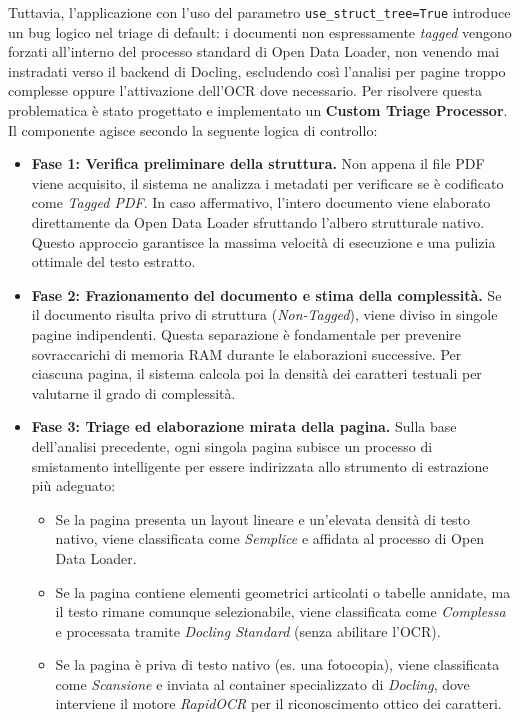 Tuttavia, l'applicazione con l'uso del parametro \texttt{use\_struct\_tree=True} introduce un bug logico nel triage di default: i documenti non espressamente \textit{tagged} vengono forzati all'interno del processo standard di Open Data Loader, non venendo mai instradati verso il backend di Docling, escludendo così l'analisi per pagine troppo complesse oppure l'attivazione dell'OCR dove necessario.
Per risolvere questa problematica è stato progettato e implementato un \textbf{Custom Triage Processor}. Il componente agisce secondo la seguente logica di controllo:

\begin{itemize}
    \item \textbf{Fase 1: Verifica preliminare della struttura.} 
    Non appena il file PDF viene acquisito, il sistema ne analizza i metadati per verificare se è codificato come \textit{Tagged PDF}. In caso affermativo, l'intero documento viene elaborato direttamente da Open Data Loader sfruttando l'albero strutturale nativo. Questo approccio garantisce la massima velocità di esecuzione e una pulizia ottimale del testo estratto.
    
    \item \textbf{Fase 2: Frazionamento del documento e stima della complessità.} 
    Se il documento risulta privo di struttura (\textit{Non-Tagged}), viene diviso in singole pagine indipendenti. Questa separazione è fondamentale per prevenire sovraccarichi di memoria RAM durante le elaborazioni successive. Per ciascuna pagina, il sistema calcola poi la densità dei caratteri testuali per valutarne il grado di complessità.
    
    \item \textbf{Fase 3: Triage ed elaborazione mirata della pagina.} 
    Sulla base dell'analisi precedente, ogni singola pagina subisce un processo di smistamento intelligente per essere indirizzata allo strumento di estrazione più adeguato:
    \begin{itemize}
        \item Se la pagina presenta un layout lineare e un'elevata densità di testo nativo, viene classificata come \textit{Semplice} e affidata al processo di Open Data Loader.
        \item Se la pagina contiene elementi geometrici articolati o tabelle annidate, ma il testo rimane comunque selezionabile, viene classificata come \textit{Complessa} e processata tramite \textit{Docling Standard} (senza abilitare l'OCR).
        \item Se la pagina è priva di testo nativo (es. una fotocopia), viene classificata come \textit{Scansione} e inviata al container specializzato di \textit{Docling}, dove interviene il motore \textit{RapidOCR} per il riconoscimento ottico dei caratteri.
    \end{itemize}
\end{itemize}

